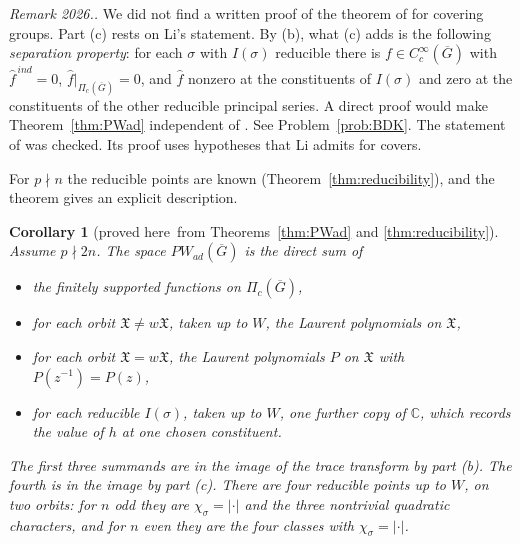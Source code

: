 \documentclass[12pt,letterpaper]{article}
\numberwithin{equation}{section}
\newtheorem{xcorollary}[theorem]{Corollary}
\theoremstyle{definition}
\newcounter{rmk}
\newcommand{\unverified}[1]{\refstepcounter{rmk}\par\smallskip\noindent\textit{Remark 2026.\arabic{rmk}.} #1\par\smallskip}
\newcommand{\proved}{proved here}
\newcommand{\C}{\mathbb C}
\newcommand{\bG}{\overline{G}}
\newcommand{\fX}{\mathfrak X}
\begin{document}
\unverified{We did not find a written proof of the theorem of \cite{BDK86} for covering
groups.  Part (c) rests on Li's statement.  By (b), what (c) adds is the following
\emph{separation property}: for each $\sigma$ with $I(\sigma)$ reducible there is
$f\in C_c^\infty(\bG)$ with $\hat f^{\,ind}=0$, $\hat f|_{\Pi_c(\bG)}=0$, and $\hat f$
nonzero at the constituents of $I(\sigma)$ and zero at the constituents of the other
reducible principal series.  A direct proof would make Theorem~\ref{thm:PWad} independent
of \cite{BDK86}.  See Problem~\ref{prob:BDK}.  The statement of
\cite[Th\'eor\`eme~5.8.10]{Li12} was checked.  Its proof uses hypotheses that Li admits for
covers.}

For $p\nmid n$ the reducible points are known (Theorem~\ref{thm:reducibility}), and the
theorem gives an explicit description.

\begin{xcorollary}[\proved\ from Theorems~\ref{thm:PWad} and \ref{thm:reducibility}]\label{cor:PWad-explicit}
Assume $p\nmid 2n$.  The space $PW_{ad}(\bG)$ is the direct sum of
\begin{itemize}[leftmargin=*,itemsep=1pt]
\item the finitely supported functions on $\Pi_c(\bG)$,
\item for each orbit $\fX\ne w\fX$, taken up to $W$, the Laurent polynomials on $\fX$,
\item for each orbit $\fX=w\fX$, the Laurent polynomials $P$ on $\fX$ with $P(z^{-1})=P(z)$,
\item for each reducible $I(\sigma)$, taken up to $W$, one further copy of $\C$, which
records the value of $h$ at one chosen constituent.
\end{itemize}
The first three summands are in the image of the trace transform by part (b).  The fourth
is in the image by part (c).  There are four reducible points up to $W$, on two orbits:
for $n$ odd they are $\chi_\sigma=|\cdot|$ and the three nontrivial quadratic characters,
and for $n$ even they are the four classes with $\chi_\sigma=|\cdot|$.
\end{xcorollary}
\end{document}
